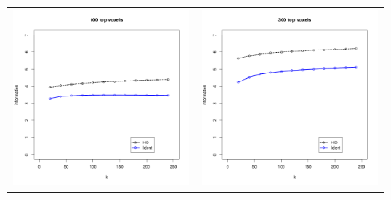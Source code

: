 \begin{figure}
\centering
\begin{tabular}{cc}
\includegraphics[scale = 0.4]{../../Yuval/ident_infer1_edited.png} &
\includegraphics[scale = 0.4]{../../Yuval/ident_infer3_edited.png} \\

\end{tabular}
\end{figure}
